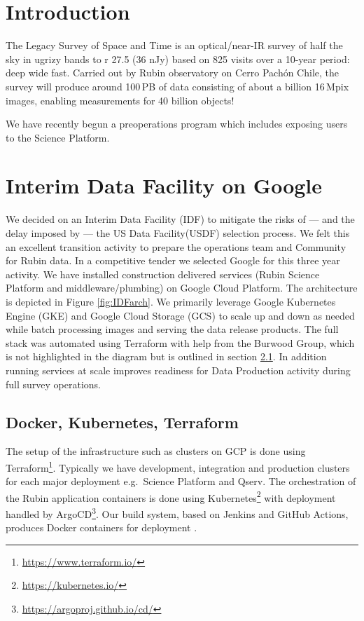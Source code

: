 
\section{Introduction}

The Legacy Survey of Space and Time \citep{2019ApJ...873..111I} is an optical/near-IR survey of half the sky in ugrizy bands to r 27.5 (36 nJy) based on 825 visits over a 10-year period: deep wide fast.
Carried out by Rubin observatory on Cerro Pach\'{o}n Chile, the survey will produce around 100\,PB of data consisting of about a billion 16\,Mpix images, enabling measurements for 40 billion objects!

We have recently begun a preoperations program which includes exposing users to the Science Platform.


\section{Interim Data Facility on Google }
We decided on an Interim Data Facility (IDF) to mitigate the risks of — and the delay imposed by — the US Data Facility(USDF)  selection process.
We felt this an excellent transition activity to prepare the operations  team and Community for Rubin data.
In a competitive tender we selected Google for this three year activity.
We have installed construction delivered services (Rubin Science Platform and middleware/plumbing) on Google Cloud Platform.
The architecture is depicted in Figure \ref{fig:IDFarch}.
We primarily leverage Google Kubernetes Engine (GKE) and Google Cloud Storage (GCS) to scale up and down as needed while batch processing images  and serving the data release products.
The full stack was automated using Terraform with help from the Burwood Group, which is not highlighted in the diagram but is outlined in section \ref{sec:infra}.
In addition running services at scale improves readiness for Data Production activity during full survey operations.







\subsection{ Docker, Kubernetes, Terraform} \label{sec:infra}
The setup of the infrastructure such as clusters on GCP is done using Terraform\footnote{\url{https://www.terraform.io/}}.
Typically we have development, integration and production clusters for each major deployment e.g.\ Science Platform and Qserv.
The orchestration of the Rubin application containers is done using Kubernetes\footnote{\url{https://kubernetes.io/}} with deployment handled by ArgoCD\footnote{\url{https://argoproj.github.io/cd/}}.
Our build system, based on Jenkins and GitHub Actions,  produces Docker containers for deployment \citep[see e.g.,][]{2018SPIE10707E..09J}.

